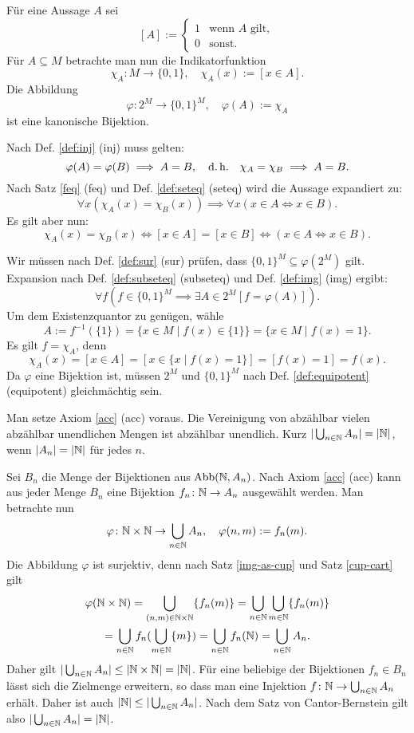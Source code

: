 \begin{Beweis}
Für eine Aussage $A$ sei
\[[A] := \begin{cases}
1&\text{wenn $A$ gilt},\\
0&\text{sonst}.
\end{cases}\]
Für $A\subseteq M$ betrachte man nun die
Indikatorfunktion
\[\chi_A\colon M\to\{0,1\},\quad \chi_A(x):=[x\in A].\]
Die Abbildung
\[\varphi\colon 2^M\to \{0,1\}^M,\quad \varphi(A):=\chi_A\]
ist eine kanonische Bijektion.

Nach Def. \ref{def:inj} (inj) muss gelten:
\[\varphi(A)=\varphi(B)\implies A=B,\quad\text{d.\,h.}\quad
\chi_A=\chi_B \implies A=B.\]
Nach Satz \ref{feq} (feq) und Def. \ref{def:seteq} (seteq)
wird die Aussage expandiert zu:
\[\forall x(\chi_A(x)=\chi_B(x))\implies \forall x(x\in A\iff x\in B).\]
Es gilt aber nun:
\[\chi_A(x)=\chi_B(x)\iff [x\in A]=[x\in B] \iff (x\in A\iff x\in B).\]
\end{Beweis}
 Wir müssen nach Def. \ref{def:sur} (sur)
prüfen, dass $\{0,1\}^M\subseteq \varphi(2^M)$ gilt.
Expansion nach Def. \ref{def:subseteq} (subseteq) und
Def. \ref{def:img} (img)
ergibt:
\[\forall f(f\in \{0,1\}^M\implies\exists A{\in}2^M[f=\varphi(A)]).\]
Um dem Existenzquantor zu genügen, wähle
\[A := f^{-1}(\{1\}) = \{x\in M\mid f(x)\in \{1\}\} = \{x\in M\mid f(x)=1\}.\]
Es gilt $f=\chi_A$, denn
\[\chi_A(x) = [x\in A] = [x\in\{x\mid f(x)=1\}] = [f(x)=1] = f(x).\]
Da $\varphi$ eine Bijektion ist, müssen $2^M$ und $\{0,1\}^M$
nach Def. \ref{def:equipotent} (equipotent) gleichmächtig
sein.\,\qedsymbol

\newpage
\begin{Satz}\label{countable-union-countable}
Man setze Axiom \ref{acc} (acc) voraus.
Die Vereinigung von abzählbar vielen abzählbar unendlichen Mengen
ist abzählbar unendlich. Kurz $|\bigcup_{n\in\mathbb N} A_n| = |\mathbb N|$, wenn
$|A_n|=|\mathbb N|$ für jedes $n$.
\end{Satz}

\begin{Beweis}
Sei $B_n$ die Menge der Bijektionen aus $\operatorname{Abb}(\mathbb N,A_n)$. 
Nach Axiom \ref{acc} (acc) kann aus jeder Menge $B_n$
eine Bijektion $f_n\colon\mathbb N\to A_n$ ausgewählt werden.
Man betrachte nun
\[\varphi\colon\mathbb N\times\mathbb N\to\bigcup_{n\in\mathbb N} A_n,\quad
\varphi(n,m):=f_n(m).\]
Die Abbildung $\varphi$ ist surjektiv, denn nach
Satz \ref{img-as-cup} und Satz \ref{cup-cart} gilt
\begin{gather*}
\varphi(\mathbb N\times\mathbb N) = \bigcup_{(n,m)\in\mathbb N{\times}\mathbb N} \{f_n(m)\}
= \bigcup_{n\in\mathbb N}\bigcup_{m\in\mathbb N} \{f_n(m)\}\\
= \bigcup_{n\in\mathbb N} f_n(\bigcup_{m\in\mathbb N} \{m\})
= \bigcup_{n\in\mathbb N} f_n(\mathbb N) = \bigcup_{n\in\mathbb N} A_n.
\end{gather*}
Daher gilt $|\bigcup_{n\in\mathbb N} A_n|\le |\mathbb N\times \mathbb N| = |\mathbb N|$.
Für eine beliebige der Bijektionen $f_n\in B_n$ lässt sich die Zielmenge
erweitern, so dass man eine Injektion $f\colon\mathbb N\to\bigcup_{n\in\mathbb N} A_n$
erhält. Daher ist auch $|\mathbb N|\le |\bigcup_{n\in\mathbb N} A_n|$. Nach dem
Satz von Cantor-Bernstein gilt also
$|\bigcup_{n\in\mathbb N} A_n|=|\mathbb N|$.\,\qedsymbol
\end{Beweis}

